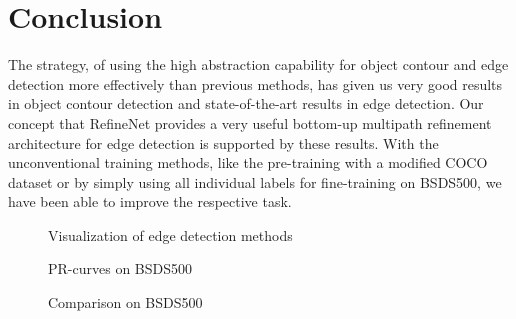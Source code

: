 \documentclass[runningheads]{llncs}
\begin{document}
\section{Conclusion}
The strategy, of using the high abstraction capability for object contour and edge detection more effectively than previous methods, has given us very good results in object contour detection and state-of-the-art results in edge detection. Our concept that RefineNet \cite{RefineNet} provides a very useful  bottom-up multipath refinement architecture for edge detection is supported by these results. With the unconventional training methods, like the pre-training with a modified COCO dataset or by simply using all individual labels for fine-training on BSDS500, we have been able to improve the respective task.
\begin{figure}[]
\centering
{} \quad
   \quad
   \quad
     \quad
  \caption{Visualization of edge detection methods\label{fig:visualedgedet}}
\end{figure}
\clearpage
\begin{figure}[t]\CenterFloatBoxes
\begin{floatrow}
{   \caption{PR-curves on BSDS500}\label{fig:PRBSDS}}
\killfloatstyle
{}
  {\caption{Comparison on BSDS500}\label{tab:BSDS}}
\end{floatrow}
\end{figure}


\end{document}

